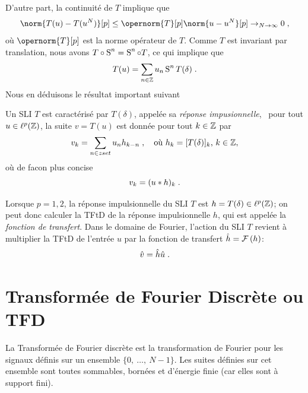 D'autre part, la continuité de $T$ implique que
\[
\norm{T(u) - T(u^N)}[p] \leq \opernorm{T}[p] \norm{u-u^N}[p] \to_{N \to \infty} 0 \eqsp,
\]
où $\opernorm{T}[p]$ est la norme opérateur de $T$. Comme $T$ est invariant par translation, nous avons $T \circ \operatorname{S}^n= \operatorname{S}^n \circ T$, ce qui implique que
\begin{equation}
\label{eq:action-operateur-2}
T(u)= \sum_{n \in \mathbb{Z}} u_n \operatorname{S}^n T(\delta) \;.
\end{equation}
Nous en déduisons le résultat important suivant
\begin{theorem}
\label{theo:caracterisation-SLI}
Un SLI $T$ est caractérisé par $T(\delta)$, appelée sa \emph{réponse impusionnelle}, \ie\ pour tout $ u \in \ell^p(\mathbb{Z})$, la suite  $v = T(u)$ est donnée pour tout $k \in \mathbb{Z}$ par
\[
v_k = \sum_{n \in zset} u_n h_{k-n} \;, \quad \text{où $h_{k} = [T(\delta)]_{k}$, $k \in \mathbb{Z}$},
\]
où de facon plus concise
\[
v_k= (u * h)_k \;.
\]
\end{theorem}
Lorsque $p=1,2$, la réponse impulsionnelle du SLI $T$ est $h=T(\delta) \in \ell^p(\mathbb{Z})$; on peut donc calculer la TFtD de la réponse impulsionnelle $h$, qui est appelée la \emph{fonction de transfert}. Dans le domaine de Fourier, l'action du SLI $T$ revient à multiplier la TFtD de l'entrée $u$ par la fonction de transfert $\hat{h}= \mathcal{F}\left( h \right)$:
\[
\hat{v}= \hat{h} \hat{u} \;.
\]

\section{Transform\'{e}e de Fourier Discr\`{e}te ou TFD}
La Transform\'{e}e de Fourier discr\`{e}te est la transformation de Fourier pour les signaux d\'{e}finis sur un ensemble $\{0,\ \ldots,\ N-1\}$. Les suites d\'{e}finies sur cet ensemble sont toutes sommables, born\'{e}es et d'\'{e}nergie finie (car elles sont \`{a} support fini).

